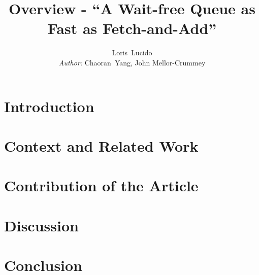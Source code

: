 \documentclass[10pt,journal,compsoc]{IEEEtran}
\begin{document}
\title{Overview - ``A Wait-free Queue as Fast as Fetch-and-Add''}

\author{Loris~Lucido\\\small{\textit{Author:} Chaoran~Yang,
        John Mellor-Crummey}}%


\maketitle

\IEEEdisplaynontitleabstractindextext
\IEEEpeerreviewmaketitle

\newcommand{\para}[1]{\textbf{\textit{#1}}\hspace{2 mm}}

\section{Introduction}\label{sec:introduction}


\section{Context and Related Work}\label{sec:context}


\section{Contribution of the Article}\label{sec:contribution}


\section{Discussion}\label{sec:discussion}


\section{Conclusion}\label{sec:conclusion}


\printbibliography
\end{document}
